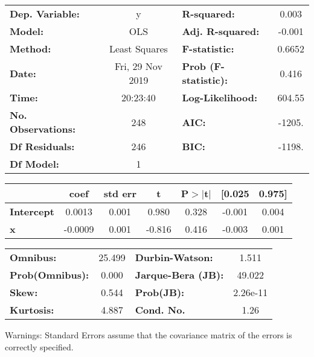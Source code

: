 \documentclass{report}
\begin{document}
\begin{center}
\begin{tabular}{lclc}
\toprule
\textbf{Dep. Variable:}    &        y         & \textbf{  R-squared:         } &     0.003   \\
\textbf{Model:}            &       OLS        & \textbf{  Adj. R-squared:    } &    -0.001   \\
\textbf{Method:}           &  Least Squares   & \textbf{  F-statistic:       } &    0.6652   \\
\textbf{Date:}             & Fri, 29 Nov 2019 & \textbf{  Prob (F-statistic):} &    0.416    \\
\textbf{Time:}             &     20:23:40     & \textbf{  Log-Likelihood:    } &    604.55   \\
\textbf{No. Observations:} &         248      & \textbf{  AIC:               } &    -1205.   \\
\textbf{Df Residuals:}     &         246      & \textbf{  BIC:               } &    -1198.   \\
\textbf{Df Model:}         &           1      & \textbf{                     } &             \\
\bottomrule
\end{tabular}
\begin{tabular}{lcccccc}
                   & \textbf{coef} & \textbf{std err} & \textbf{t} & \textbf{P$>$$|$t$|$} & \textbf{[0.025} & \textbf{0.975]}  \\
\midrule
\textbf{Intercept} &       0.0013  &        0.001     &     0.980  &         0.328        &       -0.001    &        0.004     \\
\textbf{x}         &      -0.0009  &        0.001     &    -0.816  &         0.416        &       -0.003    &        0.001     \\
\bottomrule
\end{tabular}
\begin{tabular}{lclc}
\textbf{Omnibus:}       & 25.499 & \textbf{  Durbin-Watson:     } &    1.511  \\
\textbf{Prob(Omnibus):} &  0.000 & \textbf{  Jarque-Bera (JB):  } &   49.022  \\
\textbf{Skew:}          &  0.544 & \textbf{  Prob(JB):          } & 2.26e-11  \\
\textbf{Kurtosis:}      &  4.887 & \textbf{  Cond. No.          } &     1.26  \\
\bottomrule
\end{tabular}
\end{center}

Warnings: \newline
 [1] Standard Errors assume that the covariance matrix of the errors is correctly specified.
\end{document}
